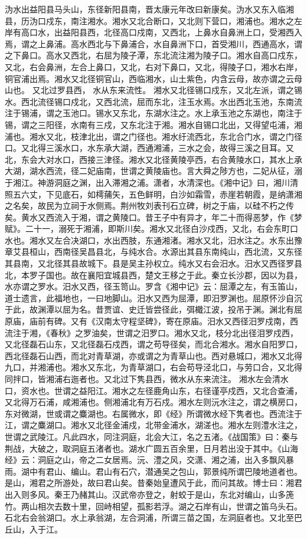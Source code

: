 \documentclass[12pt,UTF8]{ctexbook}
\begin{document}
沩水出益阳县马头山，东径新阳县南，晋太康元年改曰新康矣。沩水又东入临湘县，历沩口戍东，南注湘水。湘水又北合断口，又北则下营口，湘浦也。湘水之左岸有高口水，出益阳县西，北径高口戍南，又西北，上鼻水自鼻洲上口，受湘西入焉，谓之上鼻浦。高水西北与下鼻浦合，水自鼻洲下口，首受湘川，西通高水，谓之下鼻口。高水又西北，右屈为陵子潭，东北流注湘为陵子口。湘水自高口戍东，又北，右会鼻洲，左合上鼻口，又北，右对下鼻口，又北，得陵子口，湘水右岸，铜官浦出焉。湘水又北径铜官山，西临湘水，山土紫色，内含云母，故亦谓之云母山也。
又北过罗县西， 水从东来流性。
湘水又北径锡口戍东，又北左派，谓之锡水。西北流径锡口戍北，又西北流，屈而东北，注玉水焉。水出西北玉池，东南流注于锡浦，谓之玉池口。锡水又东北，东湖水注之。水上承玉池之东湖也，南注于锡，谓之三阳径，水南有三戍，又东北注于湘。湘水自锡口北出，又得望屯浦，湘浦也。湘水又北，枝津北出，谓之门径也。湘水纡流西北，东北合门水，谓之门径口。又北得三溪水口，水东承大湖，西通湘浦，三水之会，故得三溪之目耳。又北，东会大对水口，西接三津径。湘水又北径黄陵亭西，右合黄陵水口，其水上承大湖，湖水西流，径二妃庙南，世谓之黄陵庙也。言大舜之陟方也，二妃从征，溺于湘江。神游洞庭之渊，出入滞湘之浦。潇者，水清深也。《湘中记》曰，湘川清照五六丈，下见底石，如樗蒱矢，五色鲜明，白沙如霜雪，赤崖若朝霞，是纳潇湘之名矣，故民为立祠于水侧焉。荆州牧刘表刊石立碑，树之于庙，以硅不朽之传矣。黄水又西流入于湘，谓之黄陵口。昔王子中有异才，年二十而得恶梦，作《梦赋》。二十一，溺死于湘浦，即斯川矣。湘水又北径白沙戍西，又北，右会东町口水也。湘水又左合决湖口，水出西肢，东通湘渚。湘水又北，汨水注之。水东出豫章艾县桓山，西南径吴昌县北，与纯水合。水源出其县东南纯山，西北流，又东径其县南，又北径其县故城下。县是吴主孙权立。纯水又右会汨水。汨水又西径罗县北，本罗子国也。故在襄阳宜城县西，楚文王移之于此。秦立长沙郡，因以为县，水亦谓之罗水。汨水又西，径玉笥山。罗含《湘中记》云：屈潭之左，有玉笛山，道士遗言，此福地也，一曰地脚山。汨水又西为屈潭，即汨罗渊也。屈原怀沙自沉于此，故渊潭以屈为名。昔贾谊、史迁皆尝径此，弭檝江波，投吊于渊。渊北有屈原庙，庙前有碑。又有《汉南太守程坚碑》，寄在原庙。汨水又西径汨罗戍南，西流注于湘，《春秋》之罗油矣，世谓之汨罗口。湘水又北，枝分北出径泪罗戍西，又北径磊石山东，又北径磊石戍西，谓之苟导径矣，而北合湘水。湘水自阳罗口，西北径磊石山西，而北对青草湖，亦或谓之为青草山也。西对悬城口，湘水又北得九口，并湘浦也。湘水又东北，为青草湖口，右会苟导泾北口，与劳口合，又北得同拌口，皆湘浦右迤者也。又北过下隽县西，微水从东来流注。
湘水左会清水口，资水也。世谓之益阳江。湘水之左径鹿角山东，右径谨亭戍西，又北合查浦，又北得万石浦，咸湘浦也。侧湘浦北有万石戍。湘水左则沅水注之，谓之横房口，东对微湖，世或谓之麋湖也。右属微水，即《经》所谓微水经下隽者也。西流注于江，谓之麋湖口。湘水又北径金浦戍，北带金浦水，湖溠也。湘水左则澧水注之，世谓之武陵江。凡此四水，同注洞庭，北会大江，名之五渚。《战国策》曰：秦与荆战，大破之，取洞庭五渚者也。湖水广圆五百余里，日月若出没于其中。《山海经》云：洞庭之山，帝之二女居焉。沅、澧之风，交潇、湘之浦，出入多飘风暴雨。湖中有君山、编山。君山有石穴，潜通吴之包山，郭景纯所谓巴陵地道者也。是山，湘君之所游处，故曰君山矣。昔秦始皇遭风于此，而问其故。博士曰：湘君出入则多风。秦王乃赭其山。汉武帝亦登之，射蛟于是山，东北对编山，山多箎竹。两山相次去数十里，回峙相望，孤影若浮。湖之石岸有山，世谓之笛乌头石。石北右会翁湖口。水上承翁湖，左合洞浦，所谓三苗之国，左洞庭者也。又北至巴丘山，入于江。
\end{document}
